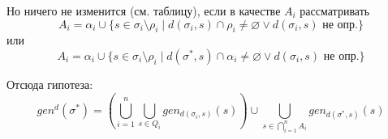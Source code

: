 Но ничего не изменится (см. таблицу), если в качестве $A_i$ рассматривать
$$A_i = \alpha_i \cup \{s \in \sigma_i\setminus\rho_i \mid d(\sigma_i, s) \cap \rho_i \neq \varnothing \vee d(\sigma_i, s) \text{ не опр.}\}$$
или
$$A_i = \alpha_i \cup \{s \in \sigma_i\setminus\rho_i \mid d(\sigma^*, s) \cap \alpha_i \neq \varnothing \vee d(\sigma_i, s) \text{ не опр.}\}$$

Отсюда гипотеза:
$$gen^d(\sigma^*) = \left( \bigcup\limits_{i = 1}^n \bigcup\limits_{s \in Q_i} gen_{d(\sigma_i, s)}(s) \right) \cup \bigcup\limits_{s \in \bigcap\limits_{i = 1}^n A_i} gen_{d(\sigma^*, s)}(s)$$
